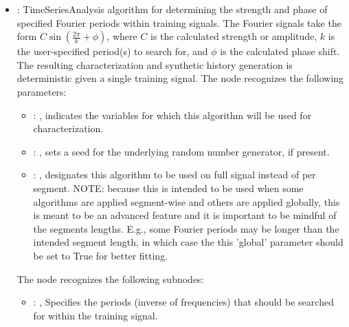 \begin{itemize}
    \item {}:
      TimeSeriesAnalysis algorithm for determining the strength and phase of
      specified Fourier periods within training signals. The Fourier signals take
      the form $C\sin(\frac{2\pi}{k}+\phi)$, where $C$ is the calculated strength
      or amplitude, $k$ is the user-specified period(s) to search for, and $\phi$
      is the calculated phase shift. The resulting characterization and synthetic
      history generation is deterministic given a single training signal.
      The  node recognizes the following parameters:
        \begin{itemize}
          \item {}: ,
            indicates the variables for which this algorithm will be used for characterization.
          \item {}: ,
            sets a seed for the underlying random number generator, if present.
          \item {}: ,
            designates this algorithm to be used on full signal instead of per
            segment. NOTE: because this is intended to be used when some algorithms are
            applied segment-wise and others are applied globally, this is meant to be an
            advanced feature and it is important to be mindful of the segments lengths.
            E.g., some Fourier periods may be longer than the intended segment length, in
            which case the this 'global' parameter should be set to True for better
            fitting. 
      \end{itemize}

      The  node recognizes the following subnodes:
      \begin{itemize}
        \item {}: ,
          Specifies the periods (inverse of frequencies) that should be searched
          for within the training signal.
      \end{itemize}


\end{itemize}
